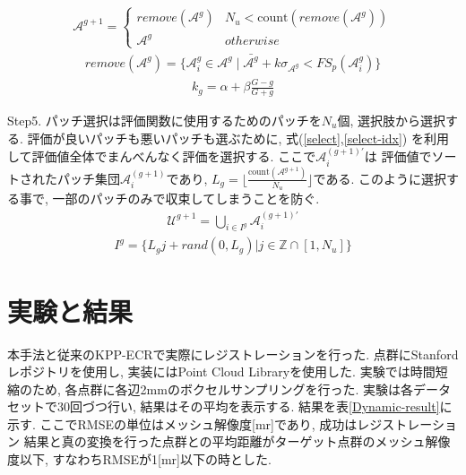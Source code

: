 \documentclass[twocolumn, 9pt, a4j, dvipdfmx]{jsarticle}
\begin{document}
\begin{align}
    \label{restrict}
    \mathcal{A}^{g+1}=
    \begin{cases}
        remove(\mathcal{A}^g) & N_u < \text{count}(remove(\mathcal{A}^g))\\
        \mathcal{A}^g & otherwise
    \end{cases}
\end{align}
\vspace{-2em}
\begin{align}
    \label{remove}
    remove(\mathcal{A}^g) = \{
        \mathcal{A}^g_i \in \mathcal{A}^g \mid 
        \bar{\mathcal{A}^g} + k\sigma_{\mathcal{A}^g} < FS_p(\mathcal{A}^g_i)
    \}
\end{align}
\vspace{-2em}
\begin{align}
    \label{trim-rate}
    k_g = \alpha + \beta \frac{G-g}{G+g}
\end{align}

Step5. パッチ選択は評価関数に使用するためのパッチを$N_u$個, 選択肢から選択する. 
評価が良いパッチも悪いパッチも選ぶために, 式(\ref{select},\ref{select-idx})
を利用して評価値全体でまんべんなく評価を選択する. 
ここで$\mathcal{A}_i^{(g+1) '}$は
評価値でソートされたパッチ集団$\mathcal{A}_i^{(g+1)}$であり, 
$L_g = \lfloor \frac{\text{count}(\mathcal{A}^{g+1})}{N_u} \rfloor$である. 
このように選択する事で, 一部のパッチのみで収束してしまうことを防ぐ. 
\begin{align}
    \label{select}
    \mathcal{U}^{g+1} = \bigcup_{i \in I^g} \mathcal{A}^{(g+1) '}_i 
\end{align}
\vspace{-2em}
\begin{align}
    \label{select-idx}
    I^g = \{L_g j + rand (0, L_g) | j \in \mathbb{Z} \cap [1, N_u]\}
\end{align}
\vspace{-2em}
\section{実験と結果}
本手法と従来のKPP-ECRで実際にレジストレーションを行った. 
点群にStanfordレポジトリ\cite{stanford}を使用し, 
実装にはPoint Cloud Library\cite{PCL}を使用した. 
実験では時間短縮のため, 各点群に各辺2mmのボクセルサンプリングを行った.  
実験は各データセットで30回づつ行い, 結果はその平均を表示する. 
結果を表\ref{Dynamic-result}に示す. 
ここでRMSEの単位はメッシュ解像度[mr]であり, 成功はレジストレーション
結果と真の変換を行った点群との平均距離がターゲット点群のメッシュ解像度以下,
すなわちRMSEが1[mr]以下の時とした. 
\end{document}
